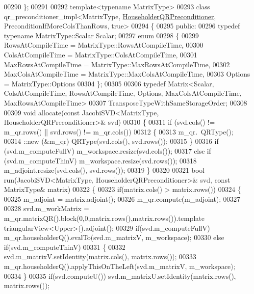 \begin{DoxyCode}
00290 \};
00291 
00292 \textcolor{keyword}{template}<\textcolor{keyword}{typename} MatrixType>
00293 \textcolor{keyword}{class }qr\_preconditioner\_impl<MatrixType, \hyperlink{group__enums_gga46eba0d5c621f590b8cf1b53af31d56ea25d36655046e5910c850f62f84f34e25}{HouseholderQRPreconditioner}, 
      PreconditionIfMoreColsThanRows, true>
00294 \{
00295 \textcolor{keyword}{public}:
00296   \textcolor{keyword}{typedef} \textcolor{keyword}{typename} MatrixType::Scalar Scalar;
00297   \textcolor{keyword}{enum}
00298   \{
00299     RowsAtCompileTime = MatrixType::RowsAtCompileTime,
00300     ColsAtCompileTime = MatrixType::ColsAtCompileTime,
00301     MaxRowsAtCompileTime = MatrixType::MaxRowsAtCompileTime,
00302     MaxColsAtCompileTime = MatrixType::MaxColsAtCompileTime,
00303     Options = MatrixType::Options
00304   \};
00305 
00306   \textcolor{keyword}{typedef} Matrix<Scalar, ColsAtCompileTime, RowsAtCompileTime, Options, MaxColsAtCompileTime,
       MaxRowsAtCompileTime>
00307           TransposeTypeWithSameStorageOrder;
00308 
00309   \textcolor{keywordtype}{void} allocate(\textcolor{keyword}{const} JacobiSVD<MatrixType, HouseholderQRPreconditioner>& svd)
00310   \{
00311     \textcolor{keywordflow}{if} (svd.cols() != m\_qr.rows() || svd.rows() != m\_qr.cols())
00312     \{
00313       m\_qr.~QRType();
00314       ::new (&m\_qr) QRType(svd.cols(), svd.rows());
00315     \}
00316     \textcolor{keywordflow}{if} (svd.m\_computeFullV) m\_workspace.resize(svd.cols());
00317     \textcolor{keywordflow}{else} \textcolor{keywordflow}{if} (svd.m\_computeThinV) m\_workspace.resize(svd.rows());
00318     m\_adjoint.resize(svd.cols(), svd.rows());
00319   \}
00320 
00321   \textcolor{keywordtype}{bool} run(JacobiSVD<MatrixType, HouseholderQRPreconditioner>& svd, \textcolor{keyword}{const} MatrixType& matrix)
00322   \{
00323     \textcolor{keywordflow}{if}(matrix.cols() > matrix.rows())
00324     \{
00325       m\_adjoint = matrix.adjoint();
00326       m\_qr.compute(m\_adjoint);
00327 
00328       svd.m\_workMatrix = m\_qr.matrixQR().block(0,0,matrix.rows(),matrix.rows()).\textcolor{keyword}{template} 
      triangularView<Upper>().adjoint();
00329       \textcolor{keywordflow}{if}(svd.m\_computeFullV) m\_qr.householderQ().evalTo(svd.m\_matrixV, m\_workspace);
00330       \textcolor{keywordflow}{else} \textcolor{keywordflow}{if}(svd.m\_computeThinV)
00331       \{
00332         svd.m\_matrixV.setIdentity(matrix.cols(), matrix.rows());
00333         m\_qr.householderQ().applyThisOnTheLeft(svd.m\_matrixV, m\_workspace);
00334       \}
00335       \textcolor{keywordflow}{if}(svd.computeU()) svd.m\_matrixU.setIdentity(matrix.rows(), matrix.rows());

\end{DoxyCode}
